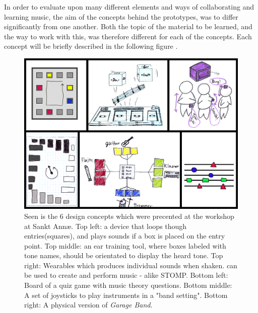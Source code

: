 In order to evaluate upon many different elements and ways of collaborating and learning music, the aim of the concepts behind the prototypes, was to differ significantly from one another. Both the topic of the material to be learned, and the way to work with this, was therefore different for each of the concepts. Each concept will be briefly described in the following figure .

\begin{figure}[H]
	\centering
	\includegraphics[width=0.9\linewidth]{figure/Design/workshopPrototypesDone} 
	\caption{Seen is the 6 design concepts which were precented at the workshop at Sankt Annæ. Top left: a device that loops though entries(squares), and plays sounds if a box is placed on the entry point. Top middle: an ear training tool, where boxes labeled with tone names, should be orientated to display the heard tone. Top right: Wearables which produces individual sounds when shaken. can be used to create and perform music - alike STOMP. Bottom left: Board of a quiz game with music theory questions. Bottom middle: A set of joysticks to play instruments in a "band setting". Bottom right: A physical version of \textit{Garage Band}\cite{Garageband}.}
	\label{fig:workshopPrototypes}
\end{figure}



